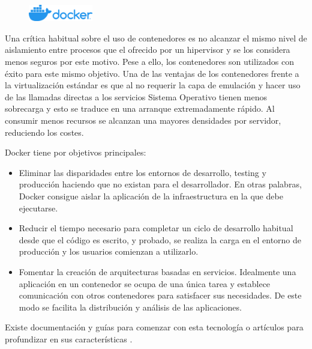 \begin{figure}
    \centering
    \includegraphics[width=0.25\textwidth]{imaxes/e-fundamentos-tecnologicos/logo-docker.png}
\end{figure}

Una crítica habitual sobre el uso de contenedores es no alcanzar el mismo nivel de aislamiento entre procesos que el ofrecido por un hipervisor y se los considera menos seguros por este motivo. Pese a ello, los contenedores son utilizados con éxito para este mismo objetivo. Una de las ventajas de los contenedores frente a la virtualización estándar es que al no requerir la capa de emulación y hacer uso de las llamadas directas a los servicios Sistema Operativo tienen menos sobrecarga y esto se traduce en una arranque extremadamente rápido. Al consumir menos recursos se alcanzan una mayores densidades por servidor, reduciendo los costes.

Docker tiene por objetivos principales:
\begin{itemize}
    \item Eliminar las disparidades entre los entornos de desarrollo, testing y producción haciendo que no existan para el desarrollador. En otras palabras, Docker consigue aislar la aplicación de la infraestructura en la que debe ejecutarse.
    \item Reducir el tiempo necesario para completar un ciclo de desarrollo habitual desde que el código es escrito, y probado, se realiza la carga en el entorno de producción y los usuarios comienzan a utilizarlo.
    \item Fomentar la creación de arquitecturas basadas en servicios. Idealmente una aplicación en un contenedor se ocupa de una única tarea y establece comunicación con otros contenedores para satisfacer sus necesidades. De este modo se facilita la distribución y análisis de las aplicaciones.
\end{itemize}

Existe documentación y guías para comenzar con esta tecnología \cite{dockerInc_web_startGuides} o artículos para profundizar en sus características \cite{turnbull_book_dockerBook}.

